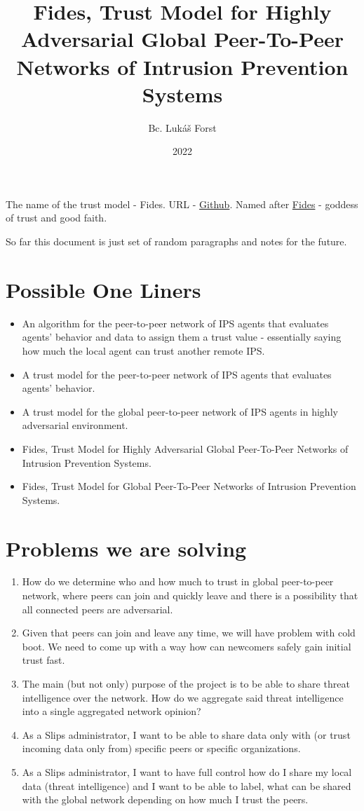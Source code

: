 \documentclass{article}
\title{Fides, Trust Model for Highly Adversarial Global Peer-To-Peer Networks of Intrusion Prevention Systems}
\author{Bc. Lukáš Forst}
\date{2022}
\begin{document}
\maketitle

The name of the trust model - Fides. URL - \href{https://github.com/LukasForst/fides}{Github}.
Named after \href{https://en.wikipedia.org/wiki/Fides_(deity)}{Fides} - goddess of trust and good faith.

So far this document is just set of random paragraphs and notes for the future.

\section{Possible One Liners}
\begin{itemize}
\item An algorithm for the peer-to-peer network of IPS agents that evaluates agents’ behavior and data to assign them a trust value - essentially saying how much the local agent can trust another remote IPS.
\item A trust model for the peer-to-peer network of IPS agents that evaluates agents’ behavior.
\item A trust model for the global peer-to-peer network of IPS agents in highly adversarial environment.
\item Fides, Trust Model for Highly Adversarial Global Peer-To-Peer Networks of Intrusion Prevention Systems.
\item Fides, Trust Model for Global Peer-To-Peer Networks of Intrusion Prevention Systems.
\end{itemize}

\section{Problems we are solving}
\begin{enumerate}
\item How do we determine who and how much to trust in global peer-to-peer network, where peers can join and quickly leave and there is a possibility that all connected peers are adversarial.
\item Given that peers can join and leave any time, we will have problem with cold boot. We need to come up with a way how can newcomers safely gain initial trust fast.
\item The main (but not only) purpose of the project is to be able to share threat intelligence over the network. How do we aggregate said threat intelligence into a single aggregated network opinion?
\item As a Slips administrator, I want to be able to share data only with (or trust incoming data only from) specific peers or specific organizations.
\item As a Slips administrator, I want to have full control how do I share my local data (threat intelligence) and I want to be able to label, what can be shared with the global network depending on how much I trust the peers.
\end{enumerate}
\end{document}
